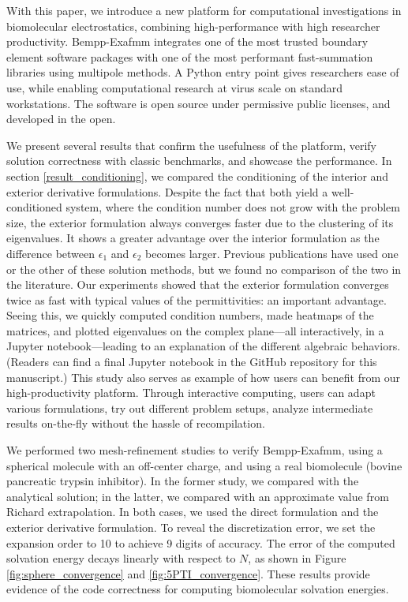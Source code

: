 With this paper, we introduce a new platform for computational investigations in biomolecular electrostatics, combining high-performance with high researcher productivity. 
Bempp-Exafmm integrates one of the most trusted boundary element software packages with one of the most performant fast-summation libraries using multipole methods. 
A Python entry point gives researchers ease of use, while enabling computational research at virus scale on standard workstations.
The software is open source under permissive public licenses, and developed in the open.

We present several results that confirm the usefulness of the platform, verify solution correctness with classic benchmarks, and showcase the performance. 
In section \ref{result_conditioning}, we compared the conditioning of the interior and exterior derivative formulations.
Despite the fact that both yield a well-conditioned system, where the condition number does not grow with the problem size, the exterior formulation always converges faster due to the clustering of its eigenvalues.
It shows a greater advantage over the interior formulation as the difference between $\epsilon_1$ and $\epsilon_2$ becomes larger.
Previous publications have used one or the other of these solution methods, but we found no comparison of the two in the literature.
Our experiments showed that the exterior formulation converges twice as fast with typical values of the permittivities: an important advantage.
Seeing this, we quickly computed condition numbers, made heatmaps of the matrices, and plotted eigenvalues on the complex plane---all interactively, in a Jupyter notebook---leading to an explanation of the different algebraic behaviors.
(Readers can find a final Jupyter notebook in the GitHub repository for this manuscript.)
This study also serves as example of how users can benefit from our high-productivity platform.
Through interactive computing, users can adapt various formulations, try out different problem setups, analyze intermediate results on-the-fly without the hassle of recompilation.

We performed two mesh-refinement studies to verify Bempp-Exafmm, using a spherical molecule with an off-center charge, and using a real biomolecule (bovine pancreatic trypsin inhibitor).
In the former study, we compared with the analytical solution; in the latter, we compared with an approximate value from Richard extrapolation.
In both cases, we used the direct formulation and the exterior derivative formulation.
To reveal the discretization error, we set the \fmm expansion order to 10 to achieve 9 digits of accuracy.
The error of the computed solvation energy decays linearly with respect to $N$, as shown in Figure \ref{fig:sphere_convergence} and \ref{fig:5PTI_convergence}.
These results provide evidence of the code correctness for computing biomolecular solvation energies.


